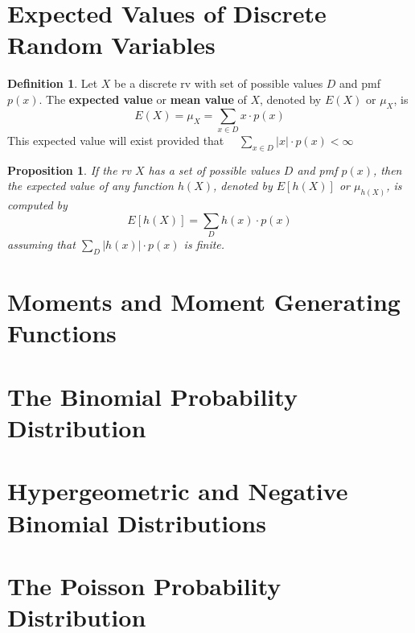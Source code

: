 \documentclass[a4paper]{report}
\theoremstyle{definition}
\newtheorem{definition}{Definition}
\theoremstyle{plain}
\newtheorem{prop}{Proposition}
\begin{document}
\section{Expected Values of Discrete Random Variables}
\begin{definition}
  Let $X$ be a discrete rv with set of possible values $D$ and pmf 
  $p(x)$. The \textbf{expected value} or \textbf{mean value} of $X$,
  denoted by $E(X)$ or $\mu_X$, is
  \begin{equation*}
    E(X) = \mu_X = \sum_{x \in D} x \cdot p(x)
  \end{equation*}
  This expected value will exist provided that $\quad \sum_{x \in D} 
  |x| \cdot p(x) < \infty$
\end{definition}

\begin{prop}
  If the rv $X$ has a set of possible values $D$ and pmf $p(x)$, then
  the expected value of any function $h(X)$, denoted by $E[h(X)]$ or
  $\mu_{h(X)}$, is computed by
  \begin{equation*}
    E[h(X)] = \sum_D h(x) \cdot p(x)
  \end{equation*}
  assuming that $\sum_D |h(x)| \cdot p(x)$ is finite.
\end{prop}

\section{Moments and Moment Generating Functions}

\section{The Binomial Probability Distribution}

\section{Hypergeometric and Negative Binomial Distributions}

\section{The Poisson Probability Distribution}
\end{document}
